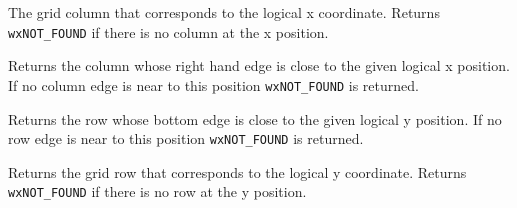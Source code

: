 
The grid column that corresponds to the logical x coordinate. Returns
{\tt wxNOT\_FOUND} if there is no column at the x position.



\label{wxgridxtoedgeofcol}


Returns the column whose right hand edge is close to the given logical x position.
If no column edge is near to this position {\tt wxNOT\_FOUND} is returned.



\label{wxgridytoedgeofrow}


Returns the row whose bottom edge is close to the given logical y position.
If no row edge is near to this position {\tt wxNOT\_FOUND} is returned.



\label{wxgridytorow}


Returns the grid row that corresponds to the logical y coordinate. Returns
{\tt wxNOT\_FOUND} if there is no row at the y position.

